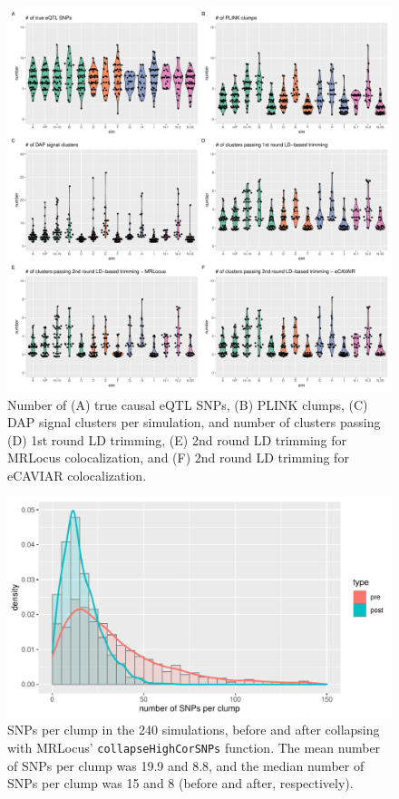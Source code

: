 \documentclass[11pt]{article}
\begin{document}
\begin{figure}[!ht]
  \centering
  \includegraphics[width=\textwidth]{figs/sim_details}
  \caption{Number of (A) true causal eQTL SNPs, (B) PLINK clumps, 
    (C) DAP signal clusters per simulation, and number of clusters
    passing (D) 1st round LD trimming, (E) 2nd round LD trimming for
    MRLocus colocalization, and (F) 2nd round LD trimming for eCAVIAR
    colocalization.}
\end{figure}

\begin{figure}[!ht]
  \centering
  \includegraphics[width=.7\textwidth]{figs/snps_per_clump}
  \caption{SNPs per clump in the 240 simulations, before and after
    collapsing with MRLocus’ \texttt{collapseHighCorSNPs}
    function. The mean number of SNPs per clump was 19.9 and 8.8, and
    the median number of SNPs per clump was 15 and 8 (before and
    after, respectively).}
\end{figure}
\end{document}
